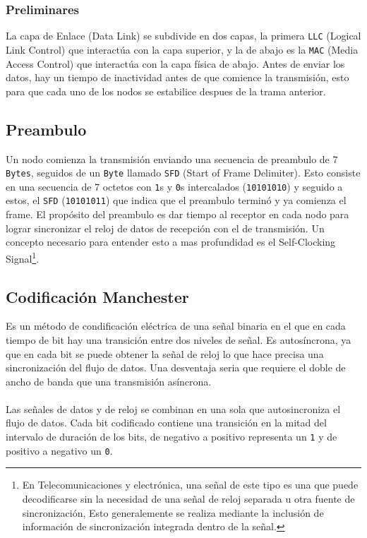 \subsubsection*{Preliminares}
La capa de Enlace (Data Link) se subdivide en dos capas, la primera \texttt{LLC} (Logical Link Control) que interactúa con la capa superior, y la de abajo es la \texttt{MAC} (Media Access Control) que interactúa con la capa física de abajo. Antes de enviar los datos, hay un tiempo de inactividad antes de que comience la transmisión, esto para que cada uno de los nodos se estabilice despues de la trama anterior.

\subsection*{Preambulo}
Un nodo comienza la transmisión enviando una secuencia  de preambulo de 7 \texttt{Bytes}, seguidos de un \texttt{Byte} llamado \texttt{SFD} (Start of Frame Delimiter). Esto consiste en una secuencia de 7 octetos con \texttt{1}s y \texttt{0}s intercalados (\texttt{10101010}) y seguido a estos, el \texttt{SFD} (\texttt{10101011}) que indica que el preambulo terminó y ya comienza el frame. El propósito del preambulo es dar tiempo al receptor en cada nodo para lograr sincronizar el reloj de datos de recepción con el de transmisión. Un concepto necesario para entender esto a mas profundidad es el Self-Clocking Signal\footnote{ En Telecomunicaciones y electrónica, una señal de este tipo es una que puede decodificarse sin la necesidad de una señal de reloj separada u otra fuente de sincronización, Esto generalemente se realiza mediante la inclusión de información de sincronización integrada dentro de la señal.}.

\subsection*{Codificación Manchester}
Es un método de condificación eléctrica de una señal binaria en el que en cada tiempo de bit hay una transición entre dos niveles de señal. Es autosíncrona, ya que en cada bit se puede obtener la señal de reloj lo que hace precisa una sincronización del flujo de datos. Una desventaja seria que requiere el doble de ancho de banda que una transmisión asíncrona. \\ ${ }$ \\
Las señales de datos y de reloj se combinan en una sola que autosincroniza el flujo de datos. Cada bit codificado contiene una transición en la mitad del intervalo de duración de los bits, de negativo a positivo representa un \texttt{1} y de positivo a negativo un \texttt{0}.
